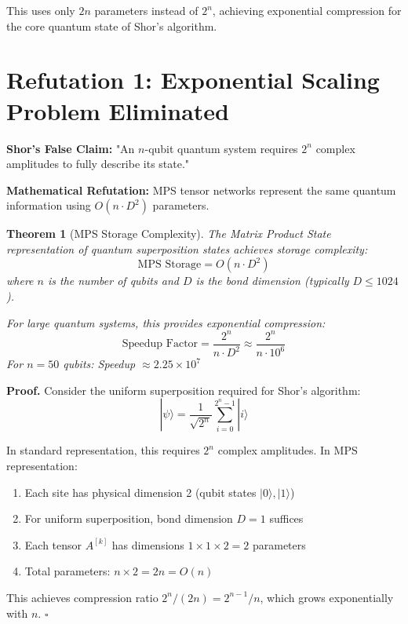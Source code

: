 \documentclass[12pt]{article}
\newtheorem{theorem}{Theorem}[section]
\newenvironment{proof}{\textbf{Proof.}}{\hfill$\square$}
\begin{document}
This uses only $2n$ parameters instead of $2^n$, achieving exponential compression for the core quantum state of Shor's algorithm.

\section{Refutation 1: Exponential Scaling Problem Eliminated}

\textbf{Shor's False Claim:} "An $n$-qubit quantum system requires $2^n$ complex amplitudes to fully describe its state."

\textbf{Mathematical Refutation:} MPS tensor networks represent the same quantum information using $O(n \cdot D^2)$ parameters.

\begin{theorem}[MPS Storage Complexity]
The Matrix Product State representation of quantum superposition states achieves storage complexity:
\begin{equation}
\text{MPS Storage} = O(n \cdot D^2)
\end{equation}
where $n$ is the number of qubits and $D$ is the bond dimension (typically $D \leq 1024$).

For large quantum systems, this provides exponential compression:
\begin{equation}
\text{Speedup Factor} = \frac{2^n}{n \cdot D^2} \approx \frac{2^n}{n \cdot 10^6}
\end{equation}
For $n = 50$ qubits: Speedup $\approx 2.25 \times 10^{7}$
\end{theorem}

\begin{proof}
Consider the uniform superposition required for Shor's algorithm:
\begin{equation}
|\psi\rangle = \frac{1}{\sqrt{2^n}} \sum_{i=0}^{2^n-1} |i\rangle
\end{equation}

In standard representation, this requires $2^n$ complex amplitudes. In MPS representation:
\begin{enumerate}
\item Each site has physical dimension 2 (qubit states $|0\rangle, |1\rangle$)
\item For uniform superposition, bond dimension $D = 1$ suffices
\item Each tensor $A^{[k]}$ has dimensions $1 \times 1 \times 2 = 2$ parameters
\item Total parameters: $n \times 2 = 2n = O(n)$
\end{enumerate}

This achieves compression ratio $2^n / (2n) = 2^{n-1}/n$, which grows exponentially with $n$.
\end{proof}
\end{document}

